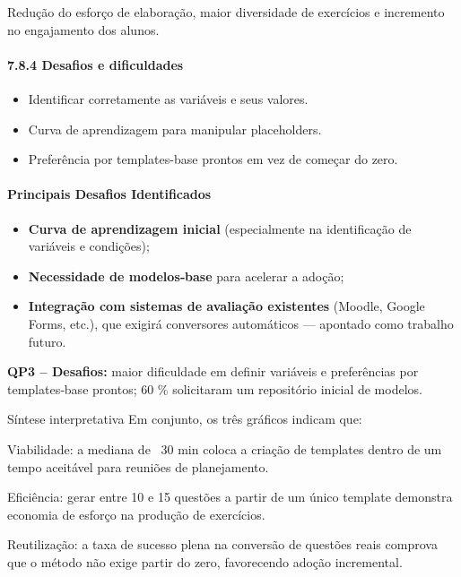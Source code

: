 Redução do esforço de elaboração, maior diversidade de exercícios e incremento no engajamento dos alunos.

\paragraph{\textbf{7.8.4 Desafios e dificuldades}}

\begin{itemize}
    \item Identificar corretamente as variáveis e seus valores.
    \item Curva de aprendizagem para manipular placeholders.
    \item Preferência por templates-base prontos em vez de começar do zero.
\end{itemize}
 

\paragraph{\textbf{Principais Desafios Identificados}}

\begin{itemize}
    \item \textbf{Curva de aprendizagem inicial} (especialmente na identificação de variáveis e condições);
    \item \textbf{Necessidade de modelos‐base} para acelerar a adoção;
    \item \textbf{Integração com sistemas de avaliação existentes} (Moodle, Google Forms, etc.), que exigirá conversores automáticos — apontado como trabalho futuro.
\end{itemize}
\textbf{QP3 – Desafios:} maior dificuldade em definir variáveis e preferências por templates‐base prontos; 60 \% solicitaram um repositório inicial de modelos. 


Síntese interpretativa
Em conjunto, os três gráficos indicam que:

Viabilidade: a mediana de ~30 min coloca a criação de templates dentro de um tempo aceitável para reuniões de planejamento.

Eficiência: gerar entre 10 e 15 questões a partir de um único template demonstra economia de esforço na produção de exercícios.

Reutilização: a taxa de sucesso plena na conversão de questões reais comprova que o método não exige partir do zero, favorecendo adoção incremental.